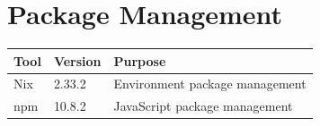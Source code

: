 \documentclass[a4paper, 12pt]{report}
\begin{document}
\section{Package Management}

\begin{center}
\begin{tabular}{lll}
\toprule
\textbf{Tool} & \textbf{Version} & \textbf{Purpose} \\
\midrule
Nix & 2.33.2 & Environment package management \\
npm & 10.8.2 & JavaScript package management \\
\bottomrule
\end{tabular}
\end{center}
\end{document}
